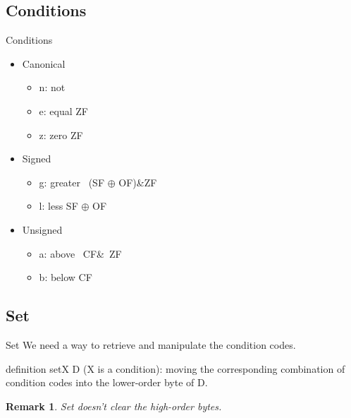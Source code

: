 \documentclass{beamer}
\newtheorem{rmk}{Remark}
\begin{document}
        \subsection{Conditions}
        \begin{frame}{Conditions}
            \begin{itemize}
                \item Canonical
                    \begin{itemize}
                        \item n: not        ~
                        \item e: equal      ZF 
                        \item z: zero       ZF
                    \end{itemize}
                \item<2-> Signed
                    \begin{itemize}
                        \item g: greater    ~(SF $\oplus$ OF)\&ZF
                        \item l: less       SF $\oplus$ OF
                    \end{itemize}
                \item<3-> Unsigned
                    \begin{itemize}
                        \item a: above      ~CF\&~ZF
                        \item b: below      CF
                    \end{itemize}
            \end{itemize}
        \end{frame}
        \subsection{Set}
        \begin{frame}{Set}
            We need a way to retrieve and manipulate the condition codes.
            \begin{block}{definition}
                setX D (X is a condition): moving the corresponding combination of condition codes into the lower-order byte of D.
            \end{block}
            \begin{rmk}
                Set doesn't clear the high-order bytes. 
            \end{rmk}
        \end{frame}
\end{document}
